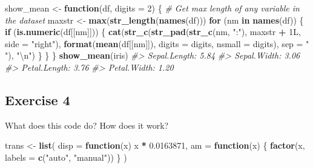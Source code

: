 \documentclass[]{book}
\newenvironment{Shaded}{\begin{snugshade}}{\end{snugshade}}
\newcommand{\CharTok}[1]{\textcolor[rgb]{0.31,0.60,0.02}{#1}}
\newcommand{\CommentTok}[1]{\textcolor[rgb]{0.56,0.35,0.01}{\textit{#1}}}
\newcommand{\ControlFlowTok}[1]{\textcolor[rgb]{0.13,0.29,0.53}{\textbf{#1}}}
\newcommand{\DataTypeTok}[1]{\textcolor[rgb]{0.13,0.29,0.53}{#1}}
\newcommand{\DecValTok}[1]{\textcolor[rgb]{0.00,0.00,0.81}{#1}}
\newcommand{\FloatTok}[1]{\textcolor[rgb]{0.00,0.00,0.81}{#1}}
\newcommand{\KeywordTok}[1]{\textcolor[rgb]{0.13,0.29,0.53}{\textbf{#1}}}
\newcommand{\NormalTok}[1]{#1}
\newcommand{\OperatorTok}[1]{\textcolor[rgb]{0.81,0.36,0.00}{\textbf{#1}}}
\newcommand{\StringTok}[1]{\textcolor[rgb]{0.31,0.60,0.02}{#1}}
\theoremstyle{definition}
\theoremstyle{definition}
\theoremstyle{definition}
\theoremstyle{remark}
\begin{document}
\begin{Shaded}
\begin{Highlighting}[]
\NormalTok{show_mean <-}\StringTok{ }\ControlFlowTok{function}\NormalTok{(df, }\DataTypeTok{digits =} \DecValTok{2}\NormalTok{) \{}
  \CommentTok{# Get max length of any variable in the dataset}
\NormalTok{  maxstr <-}\StringTok{ }\KeywordTok{max}\NormalTok{(}\KeywordTok{str_length}\NormalTok{(}\KeywordTok{names}\NormalTok{(df)))}
  \ControlFlowTok{for}\NormalTok{ (nm }\ControlFlowTok{in} \KeywordTok{names}\NormalTok{(df)) \{}
    \ControlFlowTok{if}\NormalTok{ (}\KeywordTok{is.numeric}\NormalTok{(df[[nm]])) \{}
      \KeywordTok{cat}\NormalTok{(}\KeywordTok{str_c}\NormalTok{(}\KeywordTok{str_pad}\NormalTok{(}\KeywordTok{str_c}\NormalTok{(nm, }\StringTok{":"}\NormalTok{), maxstr }\OperatorTok{+}\StringTok{ }\NormalTok{1L, }\DataTypeTok{side =} \StringTok{"right"}\NormalTok{),}
                \KeywordTok{format}\NormalTok{(}\KeywordTok{mean}\NormalTok{(df[[nm]]), }\DataTypeTok{digits =}\NormalTok{ digits, }\DataTypeTok{nsmall =}\NormalTok{ digits),}
                \DataTypeTok{sep =} \StringTok{" "}\NormalTok{),}
          \StringTok{"}\CharTok{\textbackslash{}n}\StringTok{"}\NormalTok{)}
\NormalTok{    \}}
\NormalTok{  \}}
\NormalTok{\}}
\KeywordTok{show_mean}\NormalTok{(iris)}
\CommentTok{#> Sepal.Length: 5.84 }
\CommentTok{#> Sepal.Width:  3.06 }
\CommentTok{#> Petal.Length: 3.76 }
\CommentTok{#> Petal.Width:  1.20}
\end{Highlighting}
\end{Shaded}

\hypertarget{exercise-4-31}{%
\subsection{Exercise 4}\label{exercise-4-31}}

What does this code do? How does it work?

\begin{Shaded}
\begin{Highlighting}[]
\NormalTok{trans <-}\StringTok{ }\KeywordTok{list}\NormalTok{( }
  \DataTypeTok{disp =} \ControlFlowTok{function}\NormalTok{(x) x }\OperatorTok{*}\StringTok{ }\FloatTok{0.0163871}\NormalTok{,}
  \DataTypeTok{am =} \ControlFlowTok{function}\NormalTok{(x) \{}
    \KeywordTok{factor}\NormalTok{(x, }\DataTypeTok{labels =} \KeywordTok{c}\NormalTok{(}\StringTok{"auto"}\NormalTok{, }\StringTok{"manual"}\NormalTok{))}
\NormalTok{  \}}
\NormalTok{)}
\end{Highlighting}
\end{Shaded}
\end{document}

